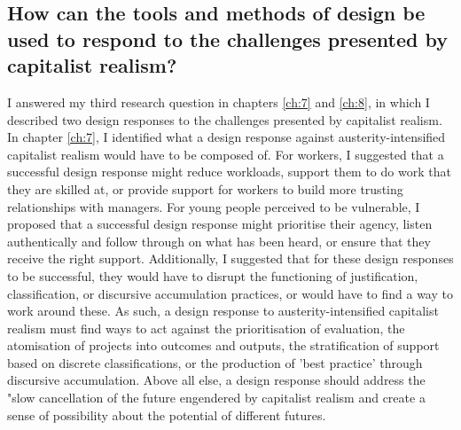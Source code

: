 \subsection{How can the tools and methods of design be used to respond to the challenges presented by capitalist realism?}
I answered my third research question in chapters \ref{ch:7} and \ref{ch:8}, in which I described two design responses to the challenges presented by capitalist realism. In chapter \ref{ch:7}, I identified what a design response against austerity-intensified capitalist realism would have to be composed of. For workers, I suggested that a successful design response might reduce workloads, support them to do work that they are skilled at, or provide support for workers to build more trusting relationships with managers. For young people perceived to be vulnerable, I proposed that a successful design response might prioritise their agency, listen authentically and follow through on what has been heard, or ensure that they receive the right support. Additionally, I suggested that for these design responses to be successful, they would have to disrupt the functioning of justification, classification, or discursive accumulation practices, or would have to find a way to work around these. As such, a design response to austerity-intensified capitalist realism must find ways to act against the prioritisation of evaluation, the atomisation of projects into outcomes and outputs, the stratification of support based on discrete classifications, or the production of 'best practice' through discursive accumulation. Above all else, a design response should address the "slow cancellation of the future \citep[5]{fisher_ghosts_2014} engendered by capitalist realism and create a sense of possibility about the potential of different futures.

